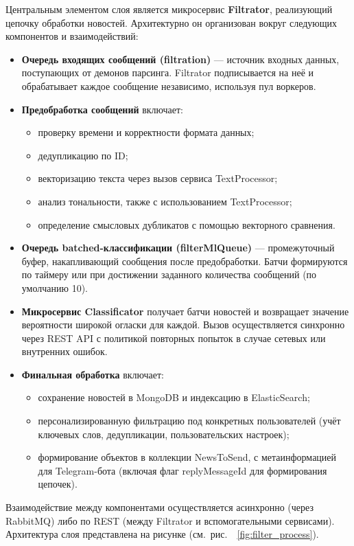 Центральным элементом слоя является микросервис \textbf{Filtrator}, реализующий цепочку обработки новостей.
Архитектурно он организован вокруг следующих компонентов и взаимодействий:
\begin{itemize}
    \item \textbf{Очередь входящих сообщений (filtration)} — источник входных данных, поступающих от демонов парсинга.
    Filtrator подписывается на неё и обрабатывает каждое сообщение независимо, используя пул воркеров.
    \item \textbf{Предобработка сообщений} включает:
    \begin{itemize}
        \item проверку времени и корректности формата данных;
        \item дедупликацию по ID;
        \item векторизацию текста через вызов сервиса TextProcessor;
        \item анализ тональности, также с использованием TextProcessor;
        \item определение смысловых дубликатов с помощью векторного сравнения.
    \end{itemize}
    \item \textbf{Очередь batched-классификации (filterMlQueue)} — промежуточный буфер, накапливающий сообщения после предобработки.
    Батчи формируются по таймеру или при достижении заданного количества сообщений (по умолчанию 10).
    \item \textbf{Микросервис Classificator} получает батчи новостей и возвращает значение вероятности широкой огласки для каждой.
    Вызов осуществляется синхронно через REST API с политикой повторных попыток в случае сетевых или внутренних ошибок.
    \item \textbf{Финальная обработка} включает:
    \begin{itemize}
        \item сохранение новостей в MongoDB и индексацию в ElasticSearch;
        \item персонализированную фильтрацию под конкретных пользователей (учёт ключевых слов, дедупликации, пользовательских настроек);
        \item формирование объектов в коллекции NewsToSend, с метаинформацией для Telegram-бота (включая флаг replyMessageId для формирования цепочек).
    \end{itemize}
\end{itemize}

Взаимодействие между компонентами осуществляется асинхронно (через RabbitMQ) либо по REST (между Filtrator и вспомогательными сервисами).
Архитектура слоя представлена на рисунке (см.\ рис.\ ~\ref{fig:filter_process}).

